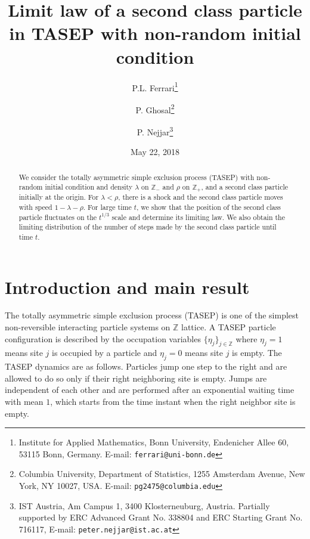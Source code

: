 \documentclass[12pt,a4paper]{article}
\title{Limit law of a second class particle in TASEP with non-random initial condition}
\author{P.L. Ferrari\thanks{Institute for Applied Mathematics, Bonn University, Endenicher Allee 60, 53115 Bonn, Germany. E-mail: {\tt ferrari@uni-bonn.de}}
\and P. Ghosal\thanks{Columbia University, Department of Statistics, 1255 Amsterdam Avenue, New York, NY 10027, USA. E-mail: {\tt pg2475@columbia.edu}}
\and P. Nejjar\thanks{IST Austria, Am Campus 1, 3400 Klosterneuburg, Austria.
 Partially supported by ERC Advanced Grant No. 338804 and ERC Starting Grant No. 716117, E-mail: {\tt peter.nejjar@ist.ac.at}}}
\date{May 22, 2018}
\numberwithin{equation}{section}
\newcommand{\Z}{\mathbb{Z}}
\begin{document}
\sloppy
\maketitle

\begin{abstract}
We consider the totally asymmetric simple exclusion process (TASEP) with non-random initial condition and  density $\lambda$ on $\Z_-$ and $\rho$ on $\Z_+$,
and a second class particle initially at the origin. For $\lambda<\rho$, there is a shock and the second class particle moves with speed $1-\lambda-\rho$.
For large time $t$, we show that the position of the second class particle fluctuates on the  $t^{1/3}$ scale and determine its limiting law. We also obtain
the limiting distribution of the number of steps made by the second class particle until time $t$.
\end{abstract}



\section{Introduction and main result}\label{sectIntro}
The totally asymmetric simple exclusion process (TASEP) is one of  the simplest non-reversible interacting particle systems on $\mathbb{Z}$ lattice. A TASEP particle configuration is described by the occupation variables $\{\eta_j\}_{j\in \mathbb{Z}}$ where $\eta_j=1$ means site $j$ is occupied by a particle and $\eta_j=0$ means site $j$ is empty. The TASEP dynamics  are  as follows.  Particles jump one step to the right and are allowed to do so only if their right neighboring site is empty. Jumps are independent of each other and are performed after an exponential waiting time with mean $1$, which starts from the time instant when the right neighbor site is empty.
\end{document}

